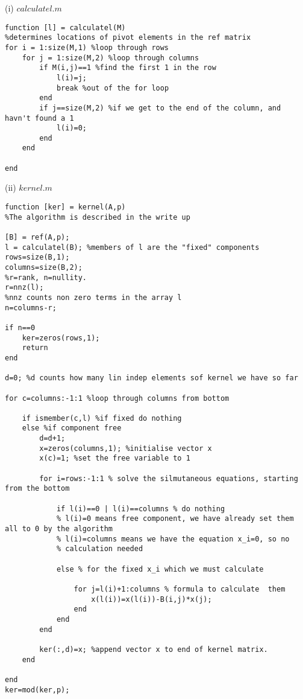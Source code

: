 \documentclass[10pt,a4paper]{report}
\begin{document}
(i) $calculatel.m$
\begin{verbatim}
function [l] = calculatel(M)
%determines locations of pivot elements in the ref matrix
for i = 1:size(M,1) %loop through rows
    for j = 1:size(M,2) %loop through columns
        if M(i,j)==1 %find the first 1 in the row
            l(i)=j; 
            break %out of the for loop
        end
        if j==size(M,2) %if we get to the end of the column, and havn't found a 1
            l(i)=0;
        end
    end

end
\end{verbatim}
\vspace{0.5cm}

(ii) $kernel.m$
\begin{verbatim}
function [ker] = kernel(A,p)
%The algorithm is described in the write up

[B] = ref(A,p);
l = calculatel(B); %members of l are the "fixed" components
rows=size(B,1);
columns=size(B,2);
%r=rank, n=nullity.
r=nnz(l);
%nnz counts non zero terms in the array l
n=columns-r;

if n==0
    ker=zeros(rows,1);
    return 
end

d=0; %d counts how many lin indep elements sof kernel we have so far

for c=columns:-1:1 %loop through columns from bottom
 
    if ismember(c,l) %if fixed do nothing
    else %if component free
        d=d+1;
        x=zeros(columns,1); %initialise vector x
        x(c)=1; %set the free variable to 1
    
        for i=rows:-1:1 % solve the silmutaneous equations, starting from the bottom
            
            if l(i)==0 | l(i)==columns % do nothing
            % l(i)=0 means free component, we have already set them all to 0 by the algorithm
            % l(i)=columns means we have the equation x_i=0, so no 
            % calculation needed 
            
            else % for the fixed x_i which we must calculate

                for j=l(i)+1:columns % formula to calculate  them
                    x(l(i))=x(l(i))-B(i,j)*x(j);
                end
            end
        end
    
        ker(:,d)=x; %append vector x to end of kernel matrix.
    end
    
end
ker=mod(ker,p);
\end{verbatim}
\vspace{0.5cm}
\end{document}
